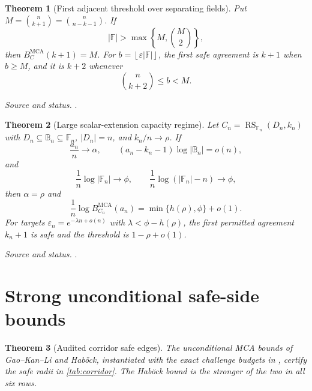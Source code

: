 \documentclass[11pt,a4paper]{amsart}
\numberwithin{equation}{section}
\newtheorem{theorem}{Theorem}[section]
\theoremstyle{remark}
\DeclareMathOperator{\RS}{RS}
\DeclareMathOperator{\MCA}{MCA}
\newcommand{\F}{\mathbb F}
\newcommand{\B}{\mathbb B}
\newcommand{\eps}{\varepsilon}
\newcommand{\abs}[1]{\lvert#1\rvert}
\newcommand{\floor}[1]{\left\lfloor#1\right\rfloor}
\newcommand{\source}[1]{\par\smallskip\noindent\textit{Source and status.} #1\par}
\begin{document}
\begin{theorem}[First adjacent threshold over separating fields]\label{thm:separating}
Put $M=\binom n{k+1}=\binom n{n-k-1}$.  If
\[
 \abs\F>\max\left\{M,\binom M2\right\},
\]
then $B_C^{\MCA}(k+1)=M$.  For $b=\floor{\eps\abs\F}$, the first safe agreement is $k+1$ when $b\ge M$, and it is $k+2$ whenever
\[
 \binom n{k+2}\le b<M.
\]
\end{theorem}
\source{\cite[Exact first adjacent row over a separating field]{ChoGF26}.}

\begin{theorem}[Large scalar-extension capacity regime]\label{thm:extension-capacity}
Let $C_n=\RS_{\F_n}(D_n,k_n)$ with $D_n\subseteq\B_n\subseteq\F_n$, $\abs{D_n}=n$, and $k_n/n\to\rho$.  If
\[
 \frac{a_n}{n}\to\alpha,
 \qquad (a_n-k_n-1)\log\abs{\B_n}=o(n),
\]
and
\[
 \frac1n\log\abs{\F_n}\to\phi,
 \qquad \frac1n\log(\abs{\F_n}-n)\to\phi,
\]
then $\alpha=\rho$ and
\[
 \frac1n\log B_{C_n}^{\MCA}(a_n)=\min\{h(\rho),\phi\}+o(1).
\]
For targets $\eps_n=e^{-\lambda n+o(n)}$ with $\lambda<\phi-h(\rho)$, the first permitted agreement $k_n+1$ is safe and the threshold is $1-\rho+o(1)$.
\end{theorem}
\source{\cite[Large scalar-extension exponent]{ChoGF26}.}

\section{Strong unconditional safe-side bounds}

\begin{theorem}[Audited corridor safe edges]\label{thm:corridor}
The unconditional MCA bounds of Gao--Kan--Li and Hab\"ock, instantiated with the exact challenge budgets in \cite{Corridor26}, certify the safe radii in \cref{tab:corridor}.  The Hab\"ock bound is the stronger of the two in all six rows.
\end{theorem}
\end{document}
